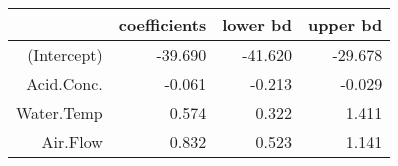 \begin{table}[ht]
\centering
\begin{tabular}{rrrr}
  \hline
 & coefficients & lower bd & upper bd \\ 
  \hline
(Intercept) & -39.690 & -41.620 & -29.678 \\ 
  Acid.Conc. & -0.061 & -0.213 & -0.029 \\ 
  Water.Temp & 0.574 & 0.322 & 1.411 \\ 
  Air.Flow & 0.832 & 0.523 & 1.141 \\ 
   \hline
\end{tabular}
\end{table}
